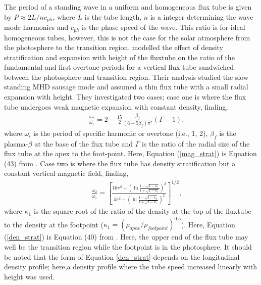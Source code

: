     The period of a standing wave in a uniform and homogeneous flux tube is given by $P \approx 2L/nc_{ph}$, where $L$ is the tube length, $n$ is a integer determining the wave mode harmonics and $c_{ph}$ is the phase speed of the wave.
    This ratio is for ideal homogeneous tubes, however, this is not the case for the solar atmosphere from the photosphere to the transition region.
    \citet{luna-cardozo} modelled the effect of density stratification and expansion with height of the fluxtube on the ratio of the fundamental and first overtone periods for a vertical flux tube sandwiched between the photosphere and transition region.
    Their analysis studied the slow standing MHD sausage mode and assumed a thin flux tube with a small radial expansion with height. 
    They investigated two cases; case one is where the flux tube undergoes weak magnetic expansion with constant density, finding,  
    \begin{align}
        &&\frac{\omega_{2}}{\omega_{1}}= 2 - \frac{15}{2}\frac{\beta_{f}}{(6+5\beta_{f})\pi^{2}}(\Gamma-1),
        \label{mag_strat}
    \end{align}
    where $\omega_{i}$ is the period of specific harmonic or overtone (i.e., 1, 2), $\beta_{f}$ is the plasma-$\beta$ at the base of the flux tube and $\Gamma$ is the ratio of the radial size of the flux tube at the apex to the foot-point.
    Here, Equation (\ref{mag_strat}) is Equation (43) from \cite{luna-cardozo}.
    Case two is where the flux tube has density stratification but a constant vertical magnetic field, finding,
    \begin{align}
        &&\frac{\omega_{2}}{\omega_{1}}= \left[\frac{16\pi^{2} + \displaystyle\left(\ln\frac{1 - \sqrt{1 - \kappa_{1}}}{1 + \sqrt{1 - \kappa_{1}}}\right)^{2}}{4\pi^2 + \displaystyle\left(\ln\frac{1 - \sqrt{1 - \kappa_{1}}}{1 + \sqrt{1 - \kappa_{1}}}\right)^{2}} \right]^{1/2},
        \label{den_strat}
    \end{align} 
	where $\kappa_{1}$ is the square root of the ratio of the density at the top of the fluxtube to the density at the footpoint ($\kappa_{1} = (\rho_{apex}/\rho_{footpoint})^{0.5}$).
    Here, Equation (\ref{den_strat}) is Equation (40) from \cite{luna-cardozo}.
    Here, the upper end of the flux tube may well be the transition region while the footpoint is in the photosphere.
    It should be noted that the form of Equation \ref{den_strat} depends on the longitudinal density profile; here,a density profile where the tube speed increased linearly with height was used.
 
